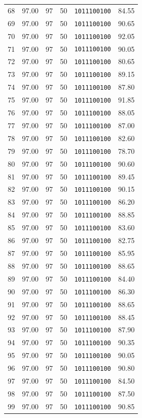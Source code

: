 \documentclass[12pt,a4paper]{article}
\begin{document}
{\begin{longtable}{c c c c c c}
68 & 97.00 & 97 & 50 & \texttt{1011100100} & 84.55 \\
69 & 97.00 & 97 & 50 & \texttt{1011100100} & 90.65 \\
70 & 97.00 & 97 & 50 & \texttt{1011100100} & 92.05 \\
71 & 97.00 & 97 & 50 & \texttt{1011100100} & 90.05 \\
72 & 97.00 & 97 & 50 & \texttt{1011100100} & 80.65 \\
73 & 97.00 & 97 & 50 & \texttt{1011100100} & 89.15 \\
74 & 97.00 & 97 & 50 & \texttt{1011100100} & 87.80 \\
75 & 97.00 & 97 & 50 & \texttt{1011100100} & 91.85 \\
76 & 97.00 & 97 & 50 & \texttt{1011100100} & 88.05 \\
77 & 97.00 & 97 & 50 & \texttt{1011100100} & 87.00 \\
78 & 97.00 & 97 & 50 & \texttt{1011100100} & 82.60 \\
79 & 97.00 & 97 & 50 & \texttt{1011100100} & 78.70 \\
80 & 97.00 & 97 & 50 & \texttt{1011100100} & 90.60 \\
81 & 97.00 & 97 & 50 & \texttt{1011100100} & 89.45 \\
82 & 97.00 & 97 & 50 & \texttt{1011100100} & 90.15 \\
83 & 97.00 & 97 & 50 & \texttt{1011100100} & 86.20 \\
84 & 97.00 & 97 & 50 & \texttt{1011100100} & 88.85 \\
85 & 97.00 & 97 & 50 & \texttt{1011100100} & 83.60 \\
86 & 97.00 & 97 & 50 & \texttt{1011100100} & 82.75 \\
87 & 97.00 & 97 & 50 & \texttt{1011100100} & 85.95 \\
88 & 97.00 & 97 & 50 & \texttt{1011100100} & 88.65 \\
89 & 97.00 & 97 & 50 & \texttt{1011100100} & 84.40 \\
90 & 97.00 & 97 & 50 & \texttt{1011100100} & 86.30 \\
91 & 97.00 & 97 & 50 & \texttt{1011100100} & 88.65 \\
92 & 97.00 & 97 & 50 & \texttt{1011100100} & 88.45 \\
93 & 97.00 & 97 & 50 & \texttt{1011100100} & 87.90 \\
94 & 97.00 & 97 & 50 & \texttt{1011100100} & 90.35 \\
95 & 97.00 & 97 & 50 & \texttt{1011100100} & 90.05 \\
96 & 97.00 & 97 & 50 & \texttt{1011100100} & 90.80 \\
97 & 97.00 & 97 & 50 & \texttt{1011100100} & 84.50 \\
98 & 97.00 & 97 & 50 & \texttt{1011100100} & 87.50 \\
99 & 97.00 & 97 & 50 & \texttt{1011100100} & 90.85 \\
\end{longtable}
}
\end{document}
